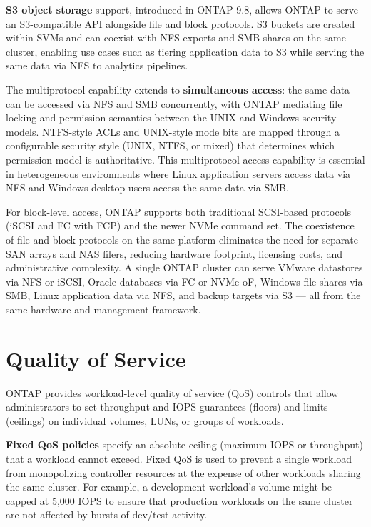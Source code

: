 \textbf{S3 object storage} support, introduced in ONTAP 9.8, allows ONTAP to serve an S3-compatible API alongside file and block protocols. S3 buckets are created within SVMs and can coexist with NFS exports and SMB shares on the same cluster, enabling use cases such as tiering application data to S3 while serving the same data via NFS to analytics pipelines.

The multiprotocol capability extends to \textbf{simultaneous access}: the same data can be accessed via NFS and SMB concurrently, with ONTAP mediating file locking and permission semantics between the UNIX and Windows security models. NTFS-style ACLs and UNIX-style mode bits are mapped through a configurable security style (UNIX, NTFS, or mixed) that determines which permission model is authoritative. This multiprotocol access capability is essential in heterogeneous environments where Linux application servers access data via NFS and Windows desktop users access the same data via SMB.

For block-level access, ONTAP supports both traditional SCSI-based protocols (iSCSI and FC with FCP) and the newer NVMe command set. The coexistence of file and block protocols on the same platform eliminates the need for separate SAN arrays and NAS filers, reducing hardware footprint, licensing costs, and administrative complexity. A single ONTAP cluster can serve VMware datastores via NFS or iSCSI, Oracle databases via FC or NVMe-oF, Windows file shares via SMB, Linux application data via NFS, and backup targets via S3 --- all from the same hardware and management framework.

\section{Quality of Service}

ONTAP provides workload-level quality of service (QoS) controls that allow administrators to set throughput and IOPS guarantees (floors) and limits (ceilings) on individual volumes, LUNs, or groups of workloads.

\textbf{Fixed QoS policies} specify an absolute ceiling (maximum IOPS or throughput) that a workload cannot exceed. Fixed QoS is used to prevent a single workload from monopolizing controller resources at the expense of other workloads sharing the same cluster. For example, a development workload's volume might be capped at 5,000 IOPS to ensure that production workloads on the same cluster are not affected by bursts of dev/test activity.

